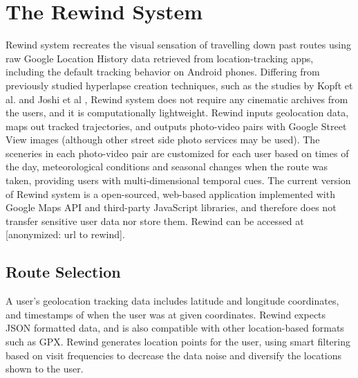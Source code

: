 \documentclass{sigchi}
\begin{document}
\section{The Rewind System}

Rewind system recreates the visual sensation of travelling down past routes using raw Google Location History data retrieved from location-tracking apps, including the default tracking behavior on Android phones. Differing from previously studied hyperlapse creation techniques, such as the studies by Kopft et al. and Joshi et al \cite{Kopf:2014:FHV:2601097.2601195, Joshi:2015:RHC:2809654.2766954}, Rewind system does not require any cinematic archives from the users, and it is computationally lightweight. Rewind inputs geolocation data, maps out tracked trajectories, and outputs photo-video pairs with Google Street View images (although other street side photo services may be used). The sceneries in each photo-video pair are customized for each user based on times of the day, meteorological conditions and seasonal changes when the route was taken, providing users with multi-dimensional temporal cues. The current version of Rewind system is a open-sourced, web-based application implemented with Google Maps API and third-party JavaScript libraries, and therefore does not transfer sensitive user data nor store them. Rewind can be accessed at [anonymized: url to rewind].  %


\subsection{Route Selection}
A user's geolocation tracking data includes latitude and longitude coordinates, and timestamps of when the user was at given coordinates. Rewind expects JSON formatted data, and is also compatible with other location-based formats such as GPX. Rewind generates location points for the user, using smart filtering based on visit frequencies to decrease the data noise and diversify the locations shown to the user.
\end{document}
